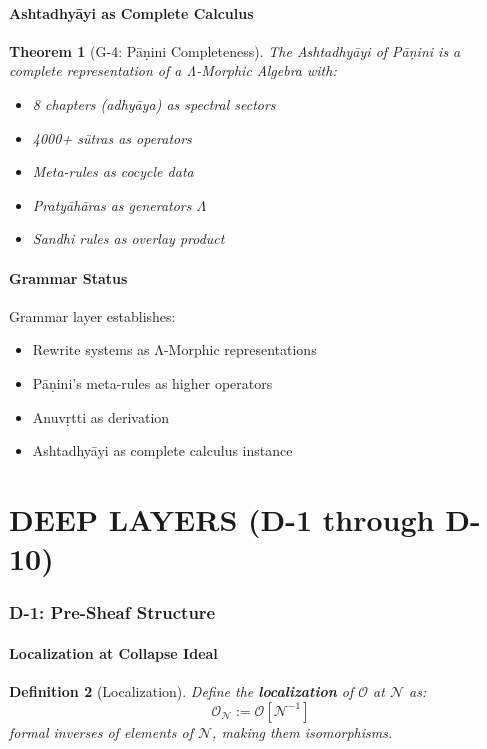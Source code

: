 \documentclass[12pt, oneside]{article}
\newtheorem{theorem}{Theorem}[section]
\newtheorem{definition}[theorem]{Definition}
\newcommand{\N}{\mathcal{N}}
\newcommand{\Opr}{\mathcal{O}}
\begin{document}
\subsection{Ashtadhyāyi as Complete Calculus}

\begin{theorem}[G-4: Pāṇini Completeness]
The Ashtadhyāyi of Pāṇini is a complete representation of a Λ-Morphic Algebra with:
\begin{itemize}
    \item 8 chapters (adhyāya) as spectral sectors
    \item 4000+ sūtras as operators
    \item Meta-rules as cocycle data
    \item Pratyāhāras as generators $\Lambda$
    \item Sandhi rules as overlay product
\end{itemize}
\end{theorem}

\subsection{Grammar Status}

Grammar layer establishes:
\begin{itemize}
    \item Rewrite systems as Λ-Morphic representations
    \item Pāṇini's meta-rules as higher operators
    \item Anuvṛtti as derivation
    \item Ashtadhyāyi as complete calculus instance
\end{itemize}

\newpage

\part{DEEP LAYERS (D-1 through D-10)}

\section{D-1: Pre-Sheaf Structure}

\subsection{Localization at Collapse Ideal}

\begin{definition}[Localization]
Define the \textbf{localization} of $\Opr$ at $\N$ as:
\begin{equation}
\Opr_\N := \Opr[\N^{-1}]
\end{equation}
formal inverses of elements of $\N$, making them isomorphisms.
\end{definition}
\end{document}
